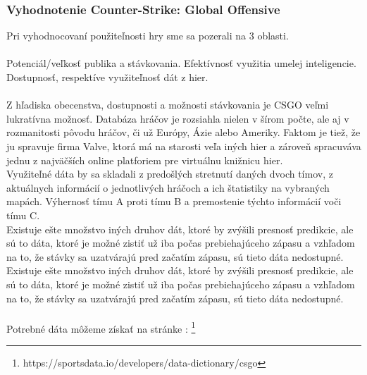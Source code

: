  

 \subsubsection{Vyhodnotenie Counter-Strike: Global Offensive}
 Pri vyhodnocovaní použiteľnosti hry sme sa pozerali na 3 oblasti. \\ \\ Potenciál/veľkosť publika a stávkovania. Efektívnosť využitia umelej inteligencie. Dostupnosť, respektíve využiteľnosť dát z hier. \\ \\
 Z hľadiska obecenstva, dostupnosti a možnosti stávkovania je CSGO veľmi lukratívna možnosť. Databáza hráčov je rozsiahla nielen v šírom počte, ale aj v rozmanitosti pôvodu hráčov, či už Európy, Ázie alebo Ameriky. Faktom je tiež, že ju spravuje firma Valve, ktorá má na starosti veľa iných hier a zároveň spracuváva jednu z najväčších online platforiem pre virtuálnu knižnicu hier. \\
 Využiteľné dáta by sa skladali z predošlých stretnutí daných dvoch tímov, z aktuálnych informácií o jednotlivých hráčoch a ich štatistiky na vybraných mapách. Výhernosť tímu A proti tímu B a premostenie týchto informácií voči tímu C.\\
 Existuje ešte množstvo iných druhov dát, ktoré by zvýšili presnosť predikcie, ale sú to dáta, ktoré je možné zistiť už iba počas prebiehajúceho zápasu a vzhľadom na to, že stávky sa uzatvárajú pred začatím zápasu, sú tieto dáta nedostupné.
  Existuje ešte množstvo iných druhov dát, ktoré by zvýšili presnosť predikcie, ale sú to dáta, ktoré je možné zistiť už iba počas prebiehajúceho zápasu a vzhľadom na to, že stávky sa uzatvárajú pred začatím zápasu, sú tieto dáta nedostupné.
 \\ \\
 Potrebné dáta môžeme získať na stránke : \footnote {
 https://sportsdata.io/developers/data-dictionary/csgo
}


